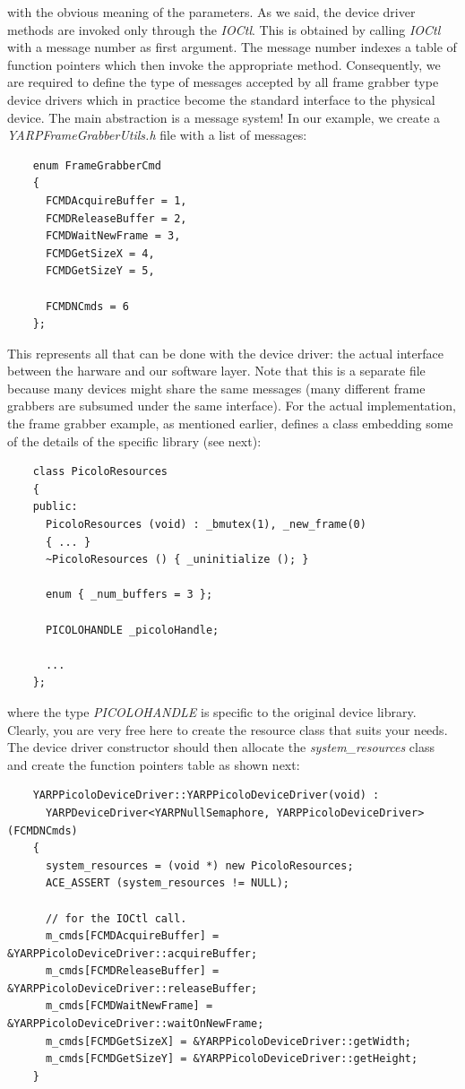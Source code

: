 \noindent with the obvious meaning of the parameters. As we said, the device driver methods are invoked only through the {\em IOCtl}. This is obtained by calling {\em IOCtl} with a message number as first argument. The message number indexes  a table of function pointers which then invoke the appropriate method. Consequently, we are required to define the type of messages accepted by all frame grabber type device drivers which in practice become the standard interface to the physical device. The main abstraction is a message system! In our example, we create a {\em YARPFrameGrabberUtils.h} file with a list of messages:

\begin{verbatim}
    enum FrameGrabberCmd
    {
      FCMDAcquireBuffer = 1,
      FCMDReleaseBuffer = 2,
      FCMDWaitNewFrame = 3,
      FCMDGetSizeX = 4,
      FCMDGetSizeY = 5,

      FCMDNCmds = 6
    };
\end{verbatim}

This represents all that can be done with the device driver: the actual interface between the harware and our software layer. Note that this is a separate file because many devices might share the same messages (many different frame grabbers are subsumed under the same interface). For the actual implementation, the frame grabber example, as mentioned earlier, defines a class embedding some of the details of the specific library (see next):

\begin{verbatim}
    class PicoloResources
    {
    public:
      PicoloResources (void) : _bmutex(1), _new_frame(0)
      { ... }
      ~PicoloResources () { _uninitialize (); }

      enum { _num_buffers = 3 };

      PICOLOHANDLE _picoloHandle;	

      ...
    };
\end{verbatim}

\noindent where the type {\em PICOLOHANDLE} is specific to the original device library. Clearly, you are very free here to create the resource class that suits your needs. The device driver constructor should then allocate the {\em system\_resources} class and create the function pointers table as shown next:

\begin{verbatim}
    YARPPicoloDeviceDriver::YARPPicoloDeviceDriver(void) : 
      YARPDeviceDriver<YARPNullSemaphore, YARPPicoloDeviceDriver>(FCMDNCmds)
    {
      system_resources = (void *) new PicoloResources;
      ACE_ASSERT (system_resources != NULL);

      // for the IOCtl call.
      m_cmds[FCMDAcquireBuffer] = &YARPPicoloDeviceDriver::acquireBuffer;
      m_cmds[FCMDReleaseBuffer] = &YARPPicoloDeviceDriver::releaseBuffer;
      m_cmds[FCMDWaitNewFrame] = &YARPPicoloDeviceDriver::waitOnNewFrame;
      m_cmds[FCMDGetSizeX] = &YARPPicoloDeviceDriver::getWidth;
      m_cmds[FCMDGetSizeY] = &YARPPicoloDeviceDriver::getHeight;
    }
\end{verbatim}

